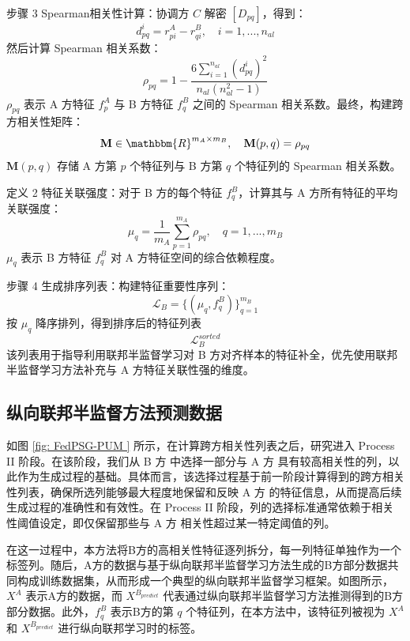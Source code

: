 步骤 3 Spearman相关性计算：协调方 $ C $ 解密 $ [D_{pq}] $，得到：
\begin{equation}
	d_{pq}^i = r^A_{pi} - r^B_{qi}, \quad i = 1, ..., n_{al}
\end{equation}
然后计算 Spearman 相关系数：
\begin{equation}
	\rho_{pq} = 1 - \frac{6\sum_{i=1}^{n_{al}} (d_{pq}^i)^2}{n_{al}(n_{al}^2 - 1)}
\end{equation}
$ \rho_{pq} $ 表示 A 方特征 $ f^A_p $ 与 B 方特征 $ f^B_q $ 之间的 Spearman 相关系数。最终，构建跨方相关性矩阵：
\begin{equation}
	\mathbf{M} \in \mathbbm{R}^{m_A \times m_B}, \quad \mathbf{M}(p,q) = \rho_{pq}
\end{equation}
$ \mathbf{M}(p,q) $ 存储 A 方第 $ p $ 个特征列与 B 方第 $ q $ 个特征列的 Spearman 相关系数。

定义 2 特征关联强度：对于 B 方的每个特征 $ f^B_q $，计算其与 A 方所有特征的平均关联强度：
\begin{equation}
	\mu_q = \frac{1}{m_A} \sum_{p=1}^{m_A} \rho_{pq}, \quad q=1,...,m_B
\end{equation}
$ \mu_q $ 表示 B 方特征 $ f^B_q $ 对 A 方特征空间的综合依赖程度。

步骤 4 生成排序列表：构建特征重要性序列：
\begin{equation}
	\mathcal{L}_B = \{(\mu_q, f^B_q)\}_{q=1}^{m_B}
\end{equation}
按 $ \mu_q $ 降序排列，得到排序后的特征列表
\begin{equation}
	\mathcal{L}_B^{sorted}
\end{equation}
该列表用于指导利用联邦半监督学习对 B 方对齐样本的特征补全，优先使用联邦半监督学习方法补充与 A 方特征关联性强的维度。
\subsection{纵向联邦半监督方法预测数据}
如图 \ref{fig: FedPSG-PUM } 所示，在计算跨方相关性列表之后，研究进入 Process II 阶段。在该阶段，我们从 B 方 中选择一部分与 A 方 具有较高相关性的列，以此作为生成过程的基础。具体而言，该选择过程基于前一阶段计算得到的跨方相关性列表，确保所选列能够最大程度地保留和反映 A 方 的特征信息，从而提高后续生成过程的准确性和有效性。在 Process II 阶段，列的选择标准通常依赖于相关性阈值设定，即仅保留那些与 A 方 相关性超过某一特定阈值的列。

在这一过程中，本方法将B方的高相关性特征逐列拆分，每一列特征单独作为一个标签列。随后，A方的数据与基于纵向联邦半监督学习方法生成的B方部分数据共同构成训练数据集，从而形成一个典型的纵向联邦半监督学习框架。如图所示，$X^A$ 表示A方的数据，而 ${{X}^{{{B}_{predict}}}}$ 代表通过纵向联邦半监督学习方法推测得到的B方部分数据。此外，$f_{q}^{B}$ 表示B方的第 $q$ 个特征列，在本方法中，该特征列被视为 $X^A$ 和 ${{X}^{{{B}_{predict}}}}$ 进行纵向联邦学习时的标签。

